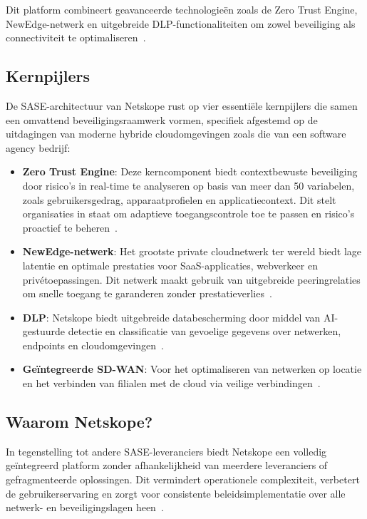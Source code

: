 Dit platform combineert geavanceerde technologieën zoals de Zero Trust Engine, NewEdge-netwerk en uitgebreide DLP-functionaliteiten om zowel beveiliging als connectiviteit te optimaliseren~\autocite{Netskope2025-1}.

\subsection{Kernpijlers}
De SASE-architectuur van Netskope rust op vier essentiële kernpijlers die samen een omvattend beveiligingsraamwerk vormen, specifiek afgestemd op de uitdagingen van moderne hybride cloudomgevingen zoals die van een software agency bedrijf:

\begin{itemize}
  \item \textbf{Zero Trust Engine}: Deze kerncomponent biedt contextbewuste beveiliging door risico's in real-time te analyseren op basis van meer dan 50 variabelen, zoals gebruikersgedrag, apparaatprofielen en applicatiecontext. Dit stelt organisaties in staat om adaptieve toegangscontrole toe te passen en risico's proactief te beheren~\autocite{Netskope2025-2}.
  \item \textbf{NewEdge-netwerk}: Het grootste private cloudnetwerk ter wereld biedt lage latentie en optimale prestaties voor SaaS-applicaties, webverkeer en privétoepassingen. Dit netwerk maakt gebruik van uitgebreide peeringrelaties om snelle toegang te garanderen zonder prestatieverlies~\autocite{Netskope2025-1}.
  \item \textbf{DLP}: Netskope biedt uitgebreide databescherming door middel van AI-gestuurde detectie en classificatie van gevoelige gegevens over netwerken, endpoints en cloudomgevingen~\autocite{Netskope2025-1}.
  \item \textbf{Geïntegreerde SD-WAN}: Voor het optimaliseren van netwerken op locatie en het verbinden van filialen met de cloud via veilige verbindingen~\autocite{Netskope2025-1}.
\end{itemize}

\subsection{Waarom Netskope?}
In tegenstelling tot andere SASE-leveranciers biedt Netskope een volledig geïntegreerd platform zonder afhankelijkheid van meerdere leveranciers of gefragmenteerde oplossingen. Dit vermindert operationele complexiteit, verbetert de gebruikerservaring en zorgt voor consistente beleidsimplementatie over alle netwerk- en beveiligingslagen heen~\autocite{Netskope2025-1}.

